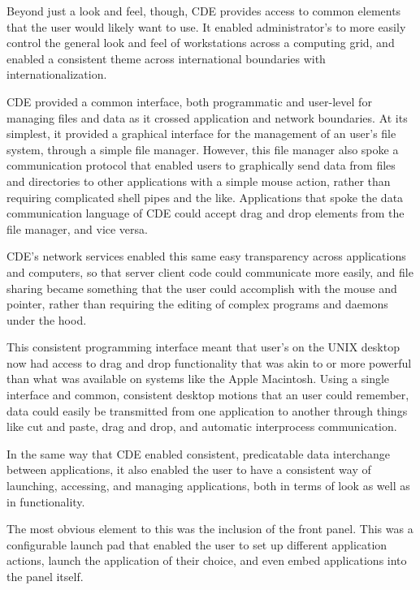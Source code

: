 Beyond just a look and feel, though, CDE provides access to common
elements that the user would likely want to use. It enabled
administrator’s to more easily control the general look and feel of
workstations across a computing grid, and enabled a consistent theme
across international boundaries with internationalization.

CDE provided a common interface, both programmatic and user-level for
managing files and data as it crossed application and network
boundaries. At its simplest, it provided a graphical interface for the
management of an user’s file system, through a simple file manager.
However, this file manager also spoke a communication protocol that
enabled users to graphically send data from files and directories to
other applications with a simple mouse action, rather than requiring
complicated shell pipes and the like. Applications that spoke the data
communication language of CDE could accept drag and drop elements from
the file manager, and vice versa. 

CDE’s network services enabled this same easy transparency across
applications and computers, so that server client code could
communicate more easily, and file sharing became something that the user
could accomplish with the mouse and pointer, rather than requiring the
editing of complex programs and daemons under the hood. 

This consistent programming interface meant that user’s on the UNIX
desktop now had access to drag and drop functionality that was akin to
or more powerful than what was available on systems like the Apple
Macintosh. Using a single interface and common, consistent desktop
motions that an user could remember, data could easily be transmitted
from one application to another through things like cut and paste, drag
and drop, and automatic interprocess communication.

In the same way that CDE enabled consistent, predicatable data
interchange between applications, it also enabled the user to have a
consistent way of launching, accessing, and managing applications, both
in terms of look as well as in functionality.

The most obvious element to this was the inclusion of the front panel.
This was a configurable launch pad that enabled the user to set up
different application actions, launch the application of their choice,
and even embed applications into the panel itself.

